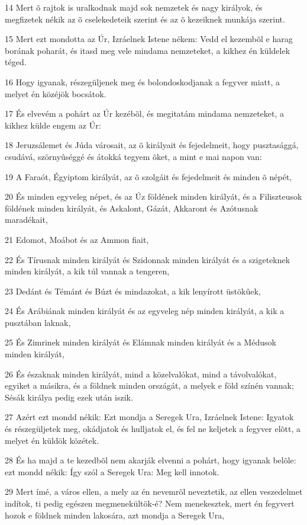\par 14 Mert õ rajtok is uralkodnak majd sok nemzetek és nagy királyok, és megfizetek nékik az õ cselekedeteik szerint és az õ kezeiknek munkája szerint.
\par 15 Mert ezt mondotta az Úr, Izráelnek Istene nékem: Vedd el kezembõl e harag borának poharát, és itasd meg vele mindama nemzeteket, a kikhez én küldelek téged.
\par 16 Hogy igyanak, részegüljenek meg és bolondoskodjanak a fegyver miatt, a melyet én közéjök bocsátok.
\par 17 És elvevém a pohárt az Úr kezébõl, és megitatám mindama nemzeteket, a kikhez külde engem az Úr:
\par 18 Jeruzsálemet és Júda városait, az õ királyait és fejedelmeit, hogy pusztasággá, csudává, szörnyûséggé és átokká tegyem õket, a mint e mai napon van:
\par 19 A Faraót, Égyiptom királyát, az õ szolgáit és fejedelmeit és minden õ népét,
\par 20 És minden egyveleg népet, és az Úz földének minden királyát, és a Filiszteusok földének minden királyát, és Askalont, Gázát, Akkaront és Azótusnak maradékait,
\par 21 Edomot, Moábot és az Ammon fiait,
\par 22 És Tírusnak minden királyát és Szidonnak minden királyát és a szigeteknek minden királyát, a kik túl vannak a tengeren,
\par 23 Dedánt és Témánt és Búzt és mindazokat, a kik lenyírott üstökûek,
\par 24 És Arábiának minden királyát és az egyveleg nép minden királyát, a kik a pusztában laknak,
\par 25 És Zimrinek minden királyát és Elámnak minden királyát és a Médusok minden királyát,
\par 26 És északnak minden királyát, mind a közelvalókat, mind a távolvalókat, egyiket a másikra, és a földnek minden országát, a melyek e föld színén vannak; Sésák királya pedig ezek után iszik.
\par 27 Azért ezt mondd nékik: Ezt mondja a Seregek Ura, Izráelnek Istene: Igyatok és részegüljetek meg, okádjatok és hulljatok el, és fel ne keljetek a fegyver elõtt, a melyet én küldök közétek.
\par 28 És ha majd a te kezedbõl nem akarják elvenni a pohárt, hogy igyanak belõle: ezt mondd nékik: Így szól a Seregek Ura: Meg kell innotok.
\par 29 Mert ímé, a város ellen, a mely az én nevemrõl neveztetik, az ellen veszedelmet indítok, ti pedig egészen megmenekültök-é? Nem menekesztek, mert én fegyvert hozok e földnek minden lakosára, azt mondja a Seregek Ura,
